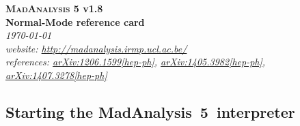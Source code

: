 \documentclass[a4paper]{article}
\newcommand{\MAnorm}{{MadAnalysis}~5}
\begin{document}
\begin{center} 
{\color{ao} \huge \textbf{\textsc{MadAnalysis} 5 v1.8}} \\ \vspace{0.25cm}
{\color{ao} \huge \textbf{Normal-Mode reference card}} \\ \vspace{0.25cm}
\vspace{0.1cm} \textsl{\today}\\
\vspace{0.1cm} \textsl{website: \url{http://madanalysis.irmp.ucl.ac.be/}}\\
\vspace{0.1cm} \textsl{references: \href{https://arxiv.org/abs/1206.1599}{arXiv:1206.1599[hep-ph]}, \href{https://arxiv.org/abs/1405.3982}{arXiv:1405.3982[hep-ph]}, \href{https://arxiv.org/abs/1407.3278}{arXiv:1407.3278[hep-ph]}}
\end{center}

\hspace{0.5cm}

\begin{shaded}
\section{\Large Starting the \MAnorm\ interpreter}
\end{shaded}
\end{document}
